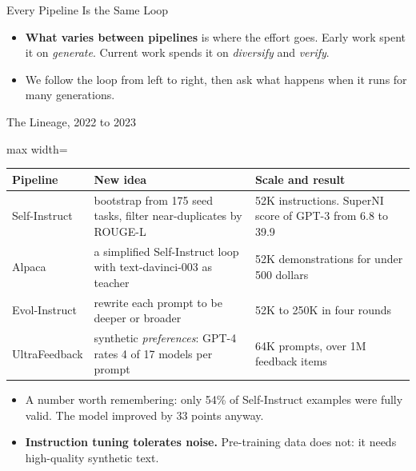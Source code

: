 \begin{frame}{Every Pipeline Is the Same Loop}
\begin{itemize}
        \item \textbf{What varies between pipelines} is where the effort goes. Early work spent it on \emph{generate}. Current work spends it on \emph{diversify} and \emph{verify}.
        \item We follow the loop from left to right, then ask what happens when it runs for many generations.
    \end{itemize}
\end{frame}

\begin{frame}{The Lineage, 2022 to 2023}
    \begin{center}
    \small
    \begin{adjustbox}{max width=\linewidth}\begin{tabular}{l>{\raggedright\arraybackslash}p{5.6cm}>{\raggedright\arraybackslash}p{5.0cm}}
        \toprule
        \textbf{Pipeline} & \textbf{New idea} & \textbf{Scale and result} \\
        \midrule
        Self-Instruct & bootstrap from 175 seed tasks, filter near-duplicates by ROUGE-L & 52K instructions. SuperNI score of GPT-3 from 6.8 to 39.9 \\
        Alpaca & a simplified Self-Instruct loop with text-davinci-003 as teacher &52K demonstrations for under 500 dollars \\
        Evol-Instruct & rewrite each prompt to be deeper or broader & 52K to 250K in four rounds \\
        UltraFeedback & synthetic \emph{preferences}: GPT-4 rates 4 of 17 models per prompt & 64K prompts, over 1M feedback items \\
        \bottomrule
    \end{tabular}\end{adjustbox}
    \end{center}
    \begin{itemize}\itemsep0.4em
        \item A number worth remembering: only \alert{54\%} of Self-Instruct examples were fully valid. The model improved by 33 points anyway.
        \item \textbf{Instruction tuning tolerates noise.} Pre-training data does not: it needs high-quality synthetic text.
    \end{itemize}
\end{frame}


